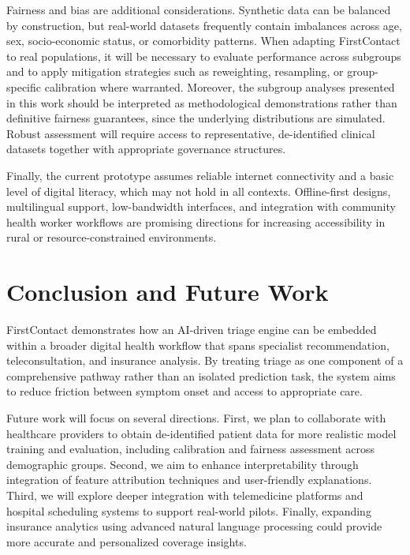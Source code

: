 \documentclass[conference]{IEEEtran}
\begin{document}
Fairness and bias are additional considerations. Synthetic data can be balanced by construction, but real-world datasets frequently contain imbalances across age, sex, socio-economic status, or comorbidity patterns. When adapting FirstContact to real populations, it will be necessary to evaluate performance across subgroups and to apply mitigation strategies such as reweighting, resampling, or group-specific calibration where warranted. Moreover, the subgroup analyses presented in this work should be interpreted as methodological demonstrations rather than definitive fairness guarantees, since the underlying distributions are simulated. Robust assessment will require access to representative, de-identified clinical datasets together with appropriate governance structures.

Finally, the current prototype assumes reliable internet connectivity and a basic level of digital literacy, which may not hold in all contexts. Offline-first designs, multilingual support, low-bandwidth interfaces, and integration with community health worker workflows are promising directions for increasing accessibility in rural or resource-constrained environments.

\section{Conclusion and Future Work}

FirstContact demonstrates how an AI-driven triage engine can be embedded within a broader digital health workflow that spans specialist recommendation, teleconsultation, and insurance analysis. By treating triage as one component of a comprehensive pathway rather than an isolated prediction task, the system aims to reduce friction between symptom onset and access to appropriate care.

Future work will focus on several directions. First, we plan to collaborate with healthcare providers to obtain de-identified patient data for more realistic model training and evaluation, including calibration and fairness assessment across demographic groups. Second, we aim to enhance interpretability through integration of feature attribution techniques and user-friendly explanations. Third, we will explore deeper integration with telemedicine platforms and hospital scheduling systems to support real-world pilots. Finally, expanding insurance analytics using advanced natural language processing could provide more accurate and personalized coverage insights.
\end{document}
